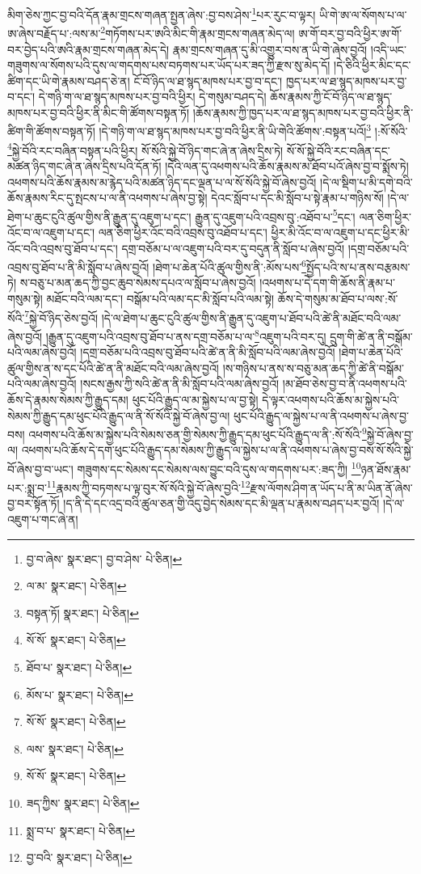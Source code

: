 མིག་ཅེས་ཀྱང་བྱ་བའི་དོན་རྣམ་གྲངས་གཞན་སྤྱན་ཞེས་:བྱ་བས་ཤེས་\footnote{བྱ་བ་ཞེས་  སྣར་ཐང་། བྱ་བ་ཤེས་  པེ་ཅིན། }པར་རུང་བ་ལྟར། ཡི་གེ་ཨ་ལ་སོགས་པ་ལ་ཨ་ཞེས་བརྗོད་པ་:ལས་མ་\footnote{ལ་མ་  སྣར་ཐང་།  པེ་ཅིན། }གཏོགས་པར་ཨའི་མིང་གི་རྣམ་གྲངས་གཞན་མེད་ལ། ཨ་གོ་བར་བྱ་བའི་ཕྱིར་ཨ་གོ་བར་བྱེད་པའི་ཨའི་རྣམ་གྲངས་གཞན་མེད་དེ། རྣམ་གྲངས་གཞན་དུ་མི་འགྱུར་བས་ན་ཡི་གེ་ཞེས་བྱའོ། །འདི་ཡང་གཟུགས་ལ་སོགས་པའི་དུས་ལ་གདགས་པས་བཏགས་པར་ཡོད་པར་ཟད་ཀྱི་རྫས་སུ་མེད་དོ། །དེ་ཅིའི་ཕྱིར་མིང་དང་ཚིག་དང་ཡི་གེ་རྣམས་བཤད་ཅེ་ན། ངོ་བོ་ཉིད་ལ་ཐ་སྙད་མཁས་པར་བྱ་བ་དང་། ཁྱད་པར་ལ་ཐ་སྙད་མཁས་པར་བྱ་བ་དང་། དེ་གཉི་ག་ལ་ཐ་སྙད་མཁས་པར་བྱ་བའི་ཕྱིར། དེ་གསུམ་བཤད་དེ། ཆོས་རྣམས་ཀྱི་ངོ་བོ་ཉིད་ལ་ཐ་སྙད་མཁས་པར་བྱ་བའི་ཕྱིར་ནི་མིང་གི་ཚོགས་བསྟན་ཏོ། །ཆོས་རྣམས་ཀྱི་ཁྱད་པར་ལ་ཐ་སྙད་མཁས་པར་བྱ་བའི་ཕྱིར་ནི་ཚིག་གི་ཚོགས་བསྟན་ཏོ། །དེ་གཉི་ག་ལ་ཐ་སྙད་མཁས་པར་བྱ་བའི་ཕྱིར་ནི་ཡི་གེའི་ཚོགས་:བསྟན་པའོ།\footnote{བསྟན་ཏོ།  སྣར་ཐང་།  པེ་ཅིན། } །:སོ་སོའི་\footnote{སོ་སོ་  སྣར་ཐང་།  པེ་ཅིན། }སྐྱེ་བོའི་རང་བཞིན་བསྟན་པའི་ཕྱིར། སོ་སོའི་སྐྱེ་བོ་ཉིད་གང་ཞེ་ན་ཞེས་དྲིས་ཏེ། སོ་སོ་སྐྱེ་བོའི་རང་བཞིན་དང་མཚན་ཉིད་གང་ཞེ་ན་ཞེས་དྲིས་པའི་དོན་ཏོ། །དེའི་ལན་དུ་འཕགས་པའི་ཆོས་རྣམས་མ་ཐོབ་པའོ་ཞེས་བྱ་བ་སྨོས་ཏེ། འཕགས་པའི་ཆོས་རྣམས་མ་རྙེད་པའི་མཚན་ཉིད་དང་ལྡན་པ་ལ་སོ་སོའི་སྐྱེ་བོ་ཞེས་བྱའོ། །དེ་ལ་སྡིག་པ་མི་དགེ་བའི་ཆོས་རྣམས་རིང་དུ་སྤངས་པ་ལ་ནི་འཕགས་པ་ཞེས་བྱ་སྟེ། དེའང་སློབ་པ་དང་མི་སློབ་པ་སྟེ་རྣམ་པ་གཉིས་སོ། །དེ་ལ་ཐེག་པ་ཆུང་ངུའི་ཚུལ་གྱིས་ནི་རྒྱུན་དུ་འཇུག་པ་དང་། རྒྱུན་དུ་འཇུག་པའི་འབྲས་བུ་:འཐོབ་པ་\footnote{ཐོབ་པ་  སྣར་ཐང་།  པེ་ཅིན། }དང་། ལན་ཅིག་ཕྱིར་འོང་བ་ལ་འཇུག་པ་དང་། ལན་ཅིག་ཕྱིར་འོང་བའི་འབྲས་བུ་འཐོབ་པ་དང་། ཕྱིར་མི་འོང་བ་ལ་འཇུག་པ་དང་ཕྱིར་མི་འོང་བའི་འབྲས་བུ་ཐོབ་པ་དང་། དགྲ་བཅོམ་པ་ལ་འཇུག་པའི་བར་དུ་བདུན་ནི་སློབ་པ་ཞེས་བྱའོ། །དགྲ་བཅོམ་པའི་འབྲས་བུ་ཐོབ་པ་ནི་མི་སློབ་པ་ཞེས་བྱའོ། །ཐེག་པ་ཆེན་པོའི་ཚུལ་གྱིས་ནི་:མོས་པས་\footnote{མོས་པ་  སྣར་ཐང་།  པེ་ཅིན། }སྤྱོད་པའི་ས་པ་ནས་བརྩམས་ཏེ། ས་བཅུ་པ་མན་ཆད་ཀྱི་བྱང་ཆུབ་སེམས་དཔའ་ལ་སློབ་པ་ཞེས་བྱའོ། །འཕགས་པ་དེ་དག་གི་ཆོས་ནི་རྣམ་པ་གསུམ་སྟེ། མཐོང་བའི་ལམ་དང་། བསྒོམ་པའི་ལམ་དང་མི་སློབ་པའི་ལམ་སྟེ། ཆོས་དེ་གསུམ་མ་ཐོབ་པ་ལས་:སོ་སོའི་\footnote{སོ་སོ་  སྣར་ཐང་།  པེ་ཅིན། }སྐྱེ་བོ་ཉིད་ཅེས་བྱའོ། །དེ་ལ་ཐེག་པ་ཆུང་ངུའི་ཚུལ་གྱིས་ནི་རྒྱུན་དུ་འཇུག་པ་ཐོབ་པའི་ཚེ་ནི་མཐོང་བའི་ལམ་ཞེས་བྱའོ། །རྒྱུན་དུ་འཇུག་པའི་འབྲས་བུ་ཐོབ་པ་ནས་དགྲ་བཅོམ་པ་ལ་\footnote{ལས་  སྣར་ཐང་།  པེ་ཅིན། }འཇུག་པའི་བར་དུ། དྲུག་གི་ཚེ་ན་ནི་བསྒོམ་པའི་ལམ་ཞེས་བྱའོ། །དགྲ་བཅོམ་པའི་འབྲས་བུ་ཐོབ་པའི་ཚེ་ན་ནི་མི་སློབ་པའི་ལམ་ཞེས་བྱའོ། །ཐེག་པ་ཆེན་པོའི་ཚུལ་གྱིས་ན་ས་དང་པོའི་ཚེ་ན་ནི་མཐོང་བའི་ལམ་ཞེས་བྱའོ། །ས་གཉིས་པ་ནས་ས་བཅུ་མན་ཆད་ཀྱི་ཚེ་ནི་བསྒོམ་པའི་ལམ་ཞེས་བྱའོ། །སངས་རྒྱས་ཀྱི་སའི་ཚེ་ན་ནི་མི་སློབ་པའི་ལམ་ཞེས་བྱའོ། །མ་ཐོབ་ཅེས་བྱ་བ་ནི་འཕགས་པའི་ཆོས་དེ་རྣམས་སེམས་ཀྱི་རྒྱུད་དམ། ཕུང་པོའི་རྒྱུད་ལ་མ་སྐྱེས་པ་ལ་བྱ་སྟེ། དེ་ལྟར་འཕགས་པའི་ཆོས་མ་སྐྱེས་པའི་སེམས་ཀྱི་རྒྱུད་དམ་ཕུང་པོའི་རྒྱུད་ལ་ནི་སོ་སོའི་སྐྱེ་བོ་ཞེས་བྱ་ལ། ཕུང་པོའི་རྒྱུད་ལ་སྐྱེས་པ་ལ་ནི་འཕགས་པ་ཞེས་བྱ་བས། འཕགས་པའི་ཆོས་མ་སྐྱེས་པའི་སེམས་ཅན་གྱི་སེམས་ཀྱི་རྒྱུད་དམ་ཕུང་པོའི་རྒྱུད་ལ་ནི་:སོ་སོའི་\footnote{སོ་སོ་  སྣར་ཐང་།  པེ་ཅིན། }སྐྱེ་བོ་ཞེས་བྱ་ལ། འཕགས་པའི་ཆོས་དེ་དག་ཕུང་པོའི་རྒྱུད་དམ་སེམས་ཀྱི་རྒྱུད་ལ་སྐྱེས་པ་ལ་ནི་འཕགས་པ་ཞེས་བྱ་བས་སོ་སོའི་སྐྱེ་བོ་ཞེས་བྱ་བ་ཡང་། གཟུགས་དང་སེམས་དང་སེམས་ལས་བྱུང་བའི་དུས་ལ་གདགས་པར་:ཟད་ཀྱི། \footnote{ཟད་ཀྱིས་  སྣར་ཐང་།  པེ་ཅིན། }ཉན་ཐོས་རྣམ་པར་:སྨྲ་བ་\footnote{སྨྲ་བ་པ་  སྣར་ཐང་།  པེ་ཅིན། }རྣམས་ཀྱི་བཏགས་པ་ལྟ་བུར་སོ་སོའི་སྐྱེ་བོ་ཞེས་བྱའི་\footnote{བྱ་བའི་  སྣར་ཐང་།  པེ་ཅིན། }རྫས་ལོགས་ཤིག་ན་ཡོད་པ་ནི་མ་ཡིན་ནོ་ཞེས་བྱ་བར་སྟོན་ཏོ། །ད་ནི་དེ་དང་འདྲ་བའི་ཚུལ་ཅན་གྱི་འདུ་བྱེད་སེམས་དང་མི་ལྡན་པ་རྣམས་བཤད་པར་བྱའོ། །དེ་ལ་འཇུག་པ་གང་ཞེ་ན། 